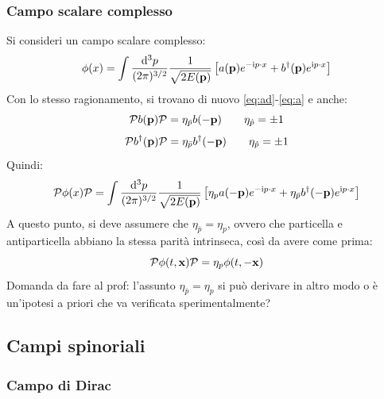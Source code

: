 \subsubsection{Campo scalare complesso}

Si consideri un campo scalare complesso:
\begin{equation*}
  \phi(x) = \int \frac{\mathrm{d}^3p}{(2\pi)^{3/2}} \frac{1}{\sqrt{2E(\mathbf{p})}} \left[ a(\mathbf{p}) e^{-\mathrm{i} p \cdot x} + b^\dagger(\mathbf{p}) e^{\mathrm{i} p \cdot x} \right]
\end{equation*}
Con lo stesso ragionamento, si trovano di nuovo \ref{eq:ad}-\ref{eq:a} e anche:
\begin{equation}
  \mathcal{P} b(\mathbf{p}) \mathcal{P} = \eta_{\bar{p}} b(-\mathbf{p})
  \qquad
  \eta_{\hat{p}} = \pm 1
  \label{eq:b}
\end{equation}
\begin{equation}
  \mathcal{P} b^\dagger(\mathbf{p}) \mathcal{P} = \eta_{\bar{p}} b^\dagger(-\mathbf{p})
  \qquad
  \eta_{\hat{p}} = \pm 1
  \label{eq:bd}
\end{equation}
Quindi:
\begin{equation*}
    \mathcal{P} \phi(x) \mathcal{P} = \int \frac{\mathrm{d}^3p}{(2\pi)^{3/2}} \frac{1}{\sqrt{2E(\mathbf{p})}} \left[ \eta_p a(-\mathbf{p}) e^{-\mathrm{i} p \cdot x} + \eta_{\bar{p}} b^\dagger(-\mathbf{p}) e^{\mathrm{i} p \cdot x} \right]
\end{equation*}
A questo punto, si deve assumere che $ \eta_{\bar{p}} = \eta_p $, ovvero che particella e antiparticella abbiano la stessa parità intrinseca, così da avere come prima:
\begin{equation}
  \mathcal{P} \phi(t,\mathbf{x}) \mathcal{P} = \eta_p \phi(t,-\mathbf{x})
\end{equation}
Domanda da fare al prof: l'assunto $ \eta_{\bar{p}} = \eta_p $ si può derivare in altro modo o è un'ipotesi a priori che va verificata sperimentalmente?

\subsection{Campi spinoriali}

\subsubsection{Campo di Dirac}

